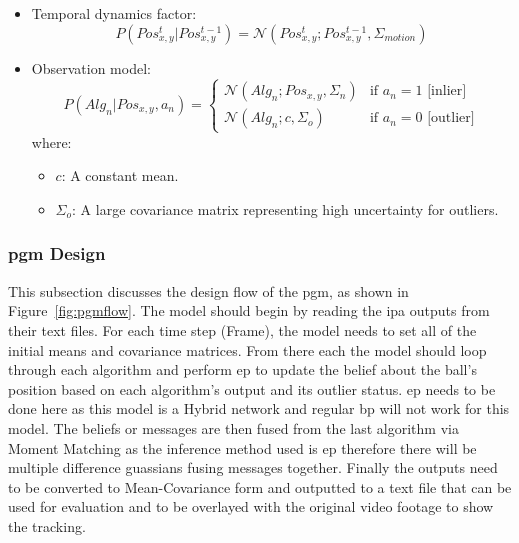 \documentclass[12pt,a4paper]{article}
\begin{document}
\begin{itemize}
	\item Temporal dynamics factor:
	\begin{equation} P(Pos_{x,y}^t | Pos_{x,y}^{t-1}) = \mathcal{N}(Pos_{x,y}^t; Pos_{x,y}^{t-1}, \Sigma_{motion}) \end{equation}
	\item Observation model:
	\begin{equation}
	P(Alg_n | Pos_{x,y}, a_n) = \begin{cases}
	\mathcal{N}(Alg_n; Pos_{x,y}, \Sigma_n) & \text{if } a_n = 1 \text{ [inlier]} \\
	\mathcal{N}(Alg_n; c, \Sigma_o) & \text{if } a_n = 0 \text{ [outlier]}
	\end{cases}
	\end{equation}
	where:
	\begin{itemize}
		\item $c$: A constant mean.
		\item $\Sigma_o$: A large covariance matrix representing high uncertainty for outliers.
	\end{itemize}
\end{itemize}

 \subsubsection{\acs{pgm} Design}
This subsection discusses the design flow of the \acs{pgm}, as shown in Figure~\ref{fig:pgmflow}. The model should begin by reading the \acs{ipa} outputs from their text files. For each time step (Frame), the model needs to set all of the initial means and covariance matrices. From there each the model should loop through each algorithm and perform \acs{ep} to update the belief about the ball's position based on each algorithm's output and its outlier status. \acs{ep} needs to be done here as this model is a Hybrid network and regular \acs{bp} will not work for this model. The beliefs or messages are then fused from the last algorithm via Moment Matching as the inference method used is \acs{ep} therefore there will be multiple difference guassians fusing messages together. Finally the outputs need to be converted to Mean-Covariance form and outputted to a text file that can be used for evaluation and to be overlayed with the original video footage to show the tracking.
 
\end{document}

